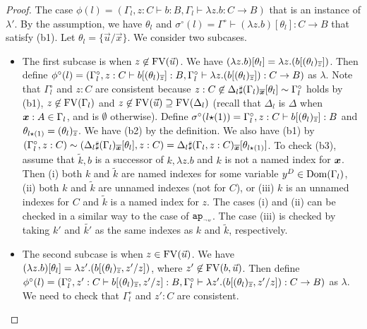\begin{proof}
  The case $\phi(l) = (\Gamma_l, z:C\vdash b:B,\Gamma_l\vdash \lambda z.b:C\to B)$
  that is an instance of $\lambda'$. 
  By the assumption, we have $\theta_l$
  and $\sigma^\circ(l)=\Gamma^\circ\vdash (\lambda z.b)[\theta_l]:C\to B$ that satisfy (b1).
  Let $\theta_l=\{\vec{u}/\vec{x}\}$. 
  We consider two subcases.
  \begin{itemize}
  \item
    The first subcase is when $z\not\in{{\rm FV}}(\vec{u})$.
    We have $(\lambda z.b)[\theta_l] = \lambda z.(b[(\theta_l)_{\overline{z}}])$.
    Then define $\phi^\circ(l) = (\Gamma^\circ_l, z:C\vdash b[(\theta_l)_{\overline{z}}]:B,\Gamma^\circ_l\vdash \lambda z.(b[(\theta_l)_{\overline{z}}]):C\to B)$ as $\lambda$. 
    Note that $\Gamma^\circ_l$ and $z:C$ are consistent
    because $z:C \not\in \Delta_l\sharp(\Gamma_l)_{\overline{\boldsymbol{x}}}[\theta_l] \sim \Gamma^\circ_l$
    holds by (b1), $z\not\in {{\rm FV}}(\Gamma_l)$ and $z \not\in{{\rm FV}}(\vec{u}) \supseteq {{\rm FV}}(\Delta_l)$
    (recall that $\Delta_l$ is $\Delta$ when $\boldsymbol{x}:A\in\Gamma_l$, and is $\emptyset$ otherwise).
    Define $\sigma^\circ(l{\star}(1)) = \Gamma^\circ_l,z:C\vdash b[(\theta_l)_{\overline{z}}]:B$
    and $\theta_{l{\star}(1)} = (\theta_l)_{\overline{z}}$.
    We have (b2) by the definition. 
    We also have (b1) by $(\Gamma^\circ_l,z:C) \sim (\Delta_l\sharp(\Gamma_l)_{\overline{\boldsymbol{x}}}[\theta_l],z:C) = \Delta_l\sharp(\Gamma_l,z:C)_{\overline{\boldsymbol{x}}}[\theta_{l{\star}(1)}]$.
    To check (b3),
    assume that $\tilde{k},b$ is a successor of $k,\lambda z.b$ and $k$ is not a named index for $\boldsymbol{x}$.
    Then (i) both $k$ and $\tilde{k}$ are named indexes for some variable $y^D\in{{\rm Dom}}(\Gamma_l)$,
    (ii) both $k$ and $\tilde{k}$ are unnamed indexes (not for $C$), or
    (iii) $k$ is an unnamed indexes for $C$ and $\tilde{k}$ is a named index for $z$.
    The cases (i) and (ii) can be checked in a similar way to the case of ${{\tt ap}_{\mbox{\tiny $\neg v$}}}$.
    The case (iii) is checked by taking $k'$ and $\tilde{k'}$ as the same indexes as $k$ and $\tilde{k}$,
    respectively.
  \item
    The second subcase is when $z\in{{\rm FV}}(\vec{u})$.
    We have $(\lambda z.b)[\theta_l] = \lambda z'.(b[(\theta_l)_{\overline{z}},z'/z])$, 
    where $z' \not\in{{\rm FV}}(b,\vec{u})$. 
    Then define $\phi^\circ(l) = (\Gamma^\circ_l, z':C\vdash b[(\theta_l)_{\overline{z}},z'/z]:B,\Gamma^\circ_l\vdash \lambda z'.(b[(\theta_l)_{\overline{z}},z'/z]):C\to B)$ as $\lambda$. 
    We need to check that $\Gamma^\circ_l$ and $z':C$ are consistent. 

\end{itemize}
\end{proof}
